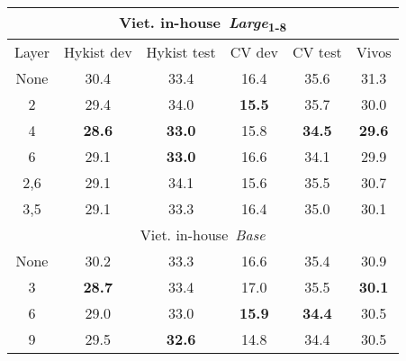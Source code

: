 \begin{table}[!ht]
\centering
\begin{adjustbox}{width=0.8\columnwidth,center}
\begin{tabular}{|c|c|c|c|c|c|} 
\hline
\multicolumn{6}{|c|}{Viet. in-house~\textit{Large}\textsubscript{1-8}}                                                                              \\ 
\hline
Layer & Hykist dev             & Hykist test            & CV dev                 & CV test                & Vivos                   \\ 
\hline
None  & 30.4                   & 33.4                   & 16.4                   & 35.6                   & 31.3                    \\ 
\hline
2     & 29.4                   & 34.0                   & \textbf{15.5}          & 35.7                   & 30.0                    \\ 
\hline
4     & \textbf{\textbf{28.6}} & \textbf{\textbf{33.0}} & 15.8                   & \textbf{\textbf{34.5}} & \textbf{\textbf{29.6}}  \\ 
\hline
6     & 29.1                   & \textbf{33.0}          & 16.6                   & 34.1                   & 29.9                    \\ 
\hline
2,6   & 29.1                   & 34.1                   & 15.6                   & 35.5                   & 30.7                    \\ 
\hline
3,5   & 29.1                   & 33.3                   & 16.4                   & 35.0                   & 30.1                    \\ 
\hline
\multicolumn{6}{|c|}{Viet. in-house~\textit{Base}}                                                                                  \\ 
\hline
None  & 30.2                   & 33.3                   & 16.6                   & 35.4                   & 30.9                    \\ 
\hline
3     & \textbf{28.7}          & 33.4                   & 17.0                   & 35.5                   & \textbf{30.1}           \\ 
\hline
6     & 29.0                   & 33.0                   & \textbf{\textbf{15.9}} & \textbf{\textbf{34.4}} & 30.5                    \\ 
\hline
9     & 29.5                   & \textbf{32.6}          & 14.8                   & 34.4                   & 30.5                    \\ 

\end{tabular}
\end{adjustbox}
\end{table}
